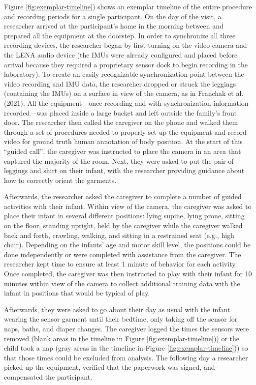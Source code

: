 \documentclass[
  man]{apa6}
\begin{document}
Figure \ref{fig:exemplar-timeline}) shows an exemplar timeline of the entire procedure and recording periods for a single participant. On the day of the visit, a researcher arrived at the participant's home in the morning between and prepared all the equipment at the doorstep. In order to synchronize all three recording devices, the researcher began by first turning on the video camera and the LENA audio device (the IMUs were already configured and placed before arrival because they required a proprietary sensor dock to begin recording in the laboratory). To create an easily recognizable synchronization point between the video recording and IMU data, the researcher dropped or struck the leggings (containing the IMUs) on a surface in view of the camera, as in Franchak et al. (2021). All the equipment---once recording and with synchronization information recorded---was placed inside a large bucket and left outside the family's front door. The researcher then called the caregiver on the phone and walked them through a set of procedures needed to properly set up the equipment and record video for ground truth human annotation of body position. At the start of this ``guided call'', the caregiver was instructed to place the camera in an area that captured the majority of the room. Next, they were asked to put the pair of leggings and shirt on their infant, with the researcher providing guidance about how to correctly orient the garments.

Afterwards, the researcher asked the caregiver to complete a number of guided activities with their infant. Within view of the camera, the caregiver was asked to place their infant in several different positions: lying supine, lying prone, sitting on the floor, standing upright, held by the caregiver while the caregiver walked back and forth, crawling, walking, and sitting in a restrained seat (e.g., high chair). Depending on the infants' age and motor skill level, the positions could be done independently or were completed with assistance from the caregiver. The researcher kept time to ensure at least 1 minute of behavior for each activity. Once completed, the caregiver was then instructed to play with their infant for 10 minutes within view of the camera to collect additional training data with the infant in positions that would be typical of play.

Afterwards, they were asked to go about their day as usual with the infant wearing the sensor garment until their bedtime, only taking off the sensor for naps, baths, and diaper changes. The caregiver logged the times the sensors were removed (blank areas in the timeline in Figure \ref{fig:exemplar-timeline})) or the child took a nap (gray areas in the timeline in Figure \ref{fig:exemplar-timeline})) so that those times could be excluded from analysis. The following day a researcher picked up the equipment, verified that the paperwork was signed, and compensated the participant.
\end{document}

